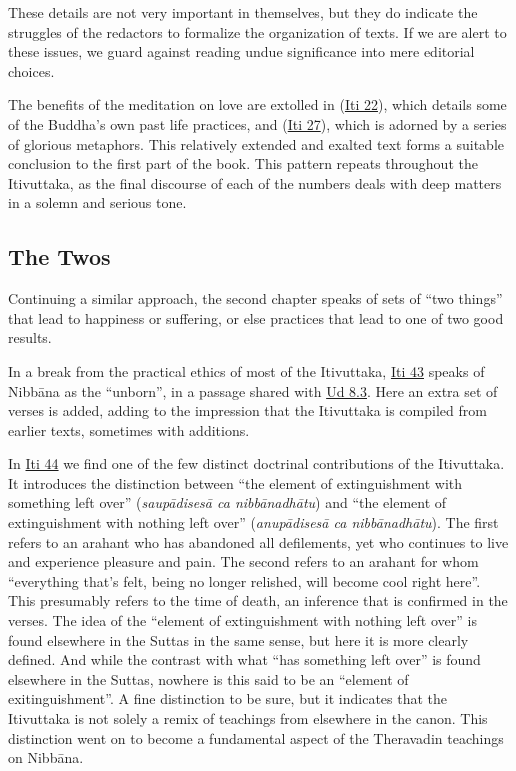 \documentclass[12pt,openany]{book}%
\begin{document}
These details are not very important in themselves, but they do indicate the struggles of the redactors to formalize the organization of texts. If we are alert to these issues, we guard against reading undue significance into mere editorial choices.

The benefits of the meditation on love are extolled in (\href{https://suttacentral.net/iti22/en/sujato}{Iti 22}), which details some of the Buddha’s own past life practices, and (\href{https://suttacentral.net/iti27/en/sujato}{Iti 27}), which is adorned by a series of glorious metaphors. This relatively extended and exalted text forms a suitable conclusion to the first part of the book. This pattern repeats throughout the Itivuttaka, as the final discourse of each of the numbers deals with deep matters in a solemn and serious tone.

\subsection*{The Twos}

Continuing a similar approach, the second chapter speaks of sets of “two things” that lead to happiness or suffering, or else practices that lead to one of two good results.

In a break from the practical ethics of most of the Itivuttaka, \href{https://suttacentral.net/iti43/en/sujato}{Iti 43} speaks of \textsanskrit{Nibbāna} as the “unborn”, in a passage shared with \href{https://suttacentral.net/ud8.3/en/sujato}{Ud 8.3}. Here an extra set of verses is added, adding to the impression that the Itivuttaka is compiled from earlier texts, sometimes with additions.

In \href{https://suttacentral.net/iti44/en/sujato}{Iti 44} we find one of the few distinct doctrinal contributions of the Itivuttaka. It introduces the distinction between “the element of extinguishment with something left over” (\emph{\textsanskrit{saupādisesā} ca \textsanskrit{nibbānadhātu}}) and “the element of extinguishment with nothing left over” (\emph{\textsanskrit{anupādisesā} ca \textsanskrit{nibbānadhātu}}). The first refers to an arahant who has abandoned all defilements, yet who continues to live and experience pleasure and pain. The second refers to an arahant for whom “everything that’s felt, being no longer relished, will become cool right here”. This presumably refers to the time of death, an inference that is confirmed in the verses. The idea of the “element of extinguishment with nothing left over” is found elsewhere in the Suttas in the same sense, but here it is more clearly defined. And while the contrast with what “has something left over” is found elsewhere in the Suttas, nowhere is this said to be an “element of exitinguishment”. A fine distinction to be sure, but it indicates that the Itivuttaka is not solely a remix of teachings from elsewhere in the canon. This distinction went on to become a fundamental aspect of the Theravadin teachings on \textsanskrit{Nibbāna}.
\end{document}
